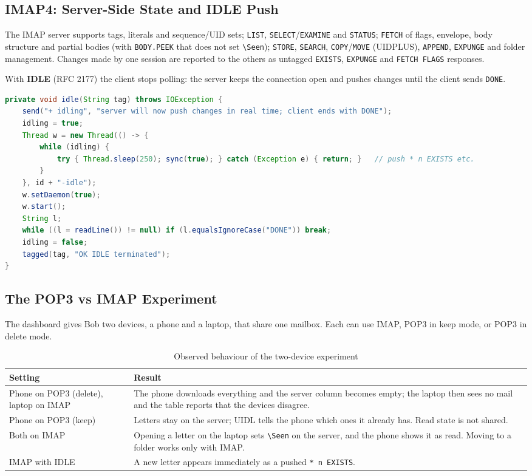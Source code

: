 \documentclass[11pt,a4paper]{article}
\begin{document}
\subsection{IMAP4: Server-Side State and IDLE Push}
The IMAP server supports tags, literals and sequence/UID sets; \texttt{LIST}, \texttt{SELECT}/\texttt{EXAMINE} and \texttt{STATUS}; \texttt{FETCH} of flags, envelope, body structure and partial bodies (with \texttt{BODY.PEEK} that does not set \texttt{\textbackslash Seen}); \texttt{STORE}, \texttt{SEARCH}, \texttt{COPY}/\texttt{MOVE} (UIDPLUS), \texttt{APPEND}, \texttt{EXPUNGE} and folder management. Changes made by one session are reported to the others as untagged \texttt{EXISTS}, \texttt{EXPUNGE} and \texttt{FETCH FLAGS} responses.

With \textbf{IDLE} (RFC 2177) the client stops polling: the server keeps the connection open and pushes changes until the client sends \texttt{DONE}.

\begin{lstlisting}[language=Java, caption={IDLE in \texttt{ImapSession.java}.}]
private void idle(String tag) throws IOException {
    send("+ idling", "server will now push changes in real time; client ends with DONE");
    idling = true;
    Thread w = new Thread(() -> {
        while (idling) {
            try { Thread.sleep(250); sync(true); } catch (Exception e) { return; }   // push * n EXISTS etc.
        }
    }, id + "-idle");
    w.setDaemon(true);
    w.start();
    String l;
    while ((l = readLine()) != null) if (l.equalsIgnoreCase("DONE")) break;
    idling = false;
    tagged(tag, "OK IDLE terminated");
}
\end{lstlisting}

\subsection{The POP3 vs IMAP Experiment}
The dashboard gives Bob two devices, a phone and a laptop, that share one mailbox. Each can use IMAP, POP3 in keep mode, or POP3 in delete mode.

\begin{table}[H]
\centering
\caption{Observed behaviour of the two-device experiment}
\small
\begin{tabularx}{\textwidth}{@{}lY@{}}
\toprule
\textbf{Setting} & \textbf{Result} \\ \midrule
Phone on POP3 (delete), laptop on IMAP & The phone downloads everything and the server column becomes empty; the laptop then sees no mail and the table reports that the devices disagree. \\
Phone on POP3 (keep) & Letters stay on the server; UIDL tells the phone which ones it already has. Read state is not shared. \\
Both on IMAP & Opening a letter on the laptop sets \texttt{\textbackslash Seen} on the server, and the phone shows it as read. Moving to a folder works only with IMAP. \\
IMAP with IDLE & A new letter appears immediately as a pushed \texttt{* n EXISTS}. \\ \bottomrule
\end{tabularx}
\end{table}
\end{document}
